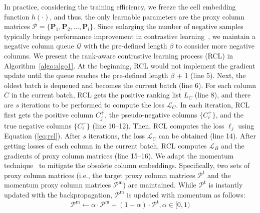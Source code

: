 In practice, considering the training efficiency, we freeze the cell embedding function $h(\cdot)$, and thus, the only learnable parameters are the proxy column  matrices $\mathcal{P} = \{\mathbf{P}_1, \mathbf{P}_2, \dots, \mathbf{P}_l \}$.
Since enlarging the number of negative samples typically brings performance improvement in contrastive learning~\cite{camper}, we maintain a  negative column queue $\mathcal{Q}$ with the pre-defined length $\beta$ to consider more negative columns.
We present the rank-aware contrastive learning process (\textsf{RCL}) in Algorithm~\ref{algo:algo1}.  At the beginning, \textsf{RCL} would not implement the gradient update until the  queue reaches the pre-defined length $\beta$ + 1 (line 5). Next, the oldest batch is dequeued and becomes the current batch (line 6).
For each column $C$ in the current batch, \textsf{RCL} gets the positive ranking list $L_C$ (line 8), and there are $s$ iterations to be performed to compute the loss $\mathcal{L}_C$. 
In each iteration, \textsf{RCL} first gets the positive column $C_j^+$, the pseudo-negative columns $\{C_r^+\}$, and  the true negative columns $\{C_i^-\}$ (line 10--12).
Then, \textsf{RCL} computes the loss $\ell_j$ using Equation (\ref{eq:rcl}). After $s$ iterations,  the loss $\mathcal{L}_C$ can be obtained (line 14). 
After getting losses of each column in the current batch, \textsf{RCL} computes $\mathcal{L}_B$ and the gradients of proxy column  matrices (line 15--16).
We adapt the momentum technique~\cite{Moco} to mitigate the obsolete column embeddings. Specifically, two sets of proxy column  matrices (i.e., the target proxy column  matrices ${\mathcal{P}}^\text{t}$ and the momentum proxy column matrices ${\mathcal{P}^\text{m}}$) are maintained. While ${\mathcal{P}}^\text{t}$ is instantly updated with the backpropagation, ${\mathcal{P}}^\text{m}$ is updated with momentum as follows:
\begin{equation}
\label{eq:mom}
    \mathbf{\mathcal{P}}^\text{m} \leftarrow \alpha \cdot \mathbf{\mathcal{P}}^\text{m}+(1-\alpha) \cdot \mathbf{\mathcal{P}}^\text{t}, \alpha \in[0,1)
\end{equation}

